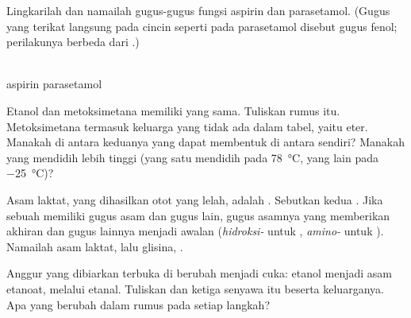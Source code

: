 \begin{exercise}[$\star\star\star$]\label{exo:g11:functional-groups:12}
Lingkarilah dan namailah gugus-gugus fungsi aspirin dan parasetamol.
(Gugus  yang terikat langsung pada cincin seperti pada
parasetamol disebut gugus fenol; perilakunya berbeda dari .)
\begin{center}
\qquad
{}
\\[2pt] \small aspirin \hspace{4.2cm} parasetamol
\end{center}
\end{exercise}

\begin{exercise}[$\star\star\star$]\label{exo:g11:functional-groups:13}
Etanol  dan metoksimetana  memiliki  yang sama. Tuliskan rumus itu. Metoksimetana termasuk keluarga
yang tidak ada dalam tabel, yaitu eter. Manakah di antara keduanya yang
dapat membentuk  di antara  sendiri?
Manakah yang mendidih lebih tinggi (yang satu mendidih pada
\qty{78}{\celsius}, yang lain pada \qty{-25}{\celsius})?
\end{exercise}

\begin{exercise}[$\star\star\star$]\label{exo:g11:functional-groups:14}
Asam laktat, yang dihasilkan otot yang lelah, adalah
. Sebutkan kedua . Jika
sebuah  memiliki gugus asam dan gugus lain, gugus asamnya yang
memberikan akhiran dan gugus lainnya menjadi awalan (\emph{hidroksi-}
untuk , \emph{amino-} untuk ). Namailah asam laktat,
lalu glisina, .
\end{exercise}

\begin{exercise}[$\star\star\star$]\label{exo:g11:functional-groups:15}
Anggur yang dibiarkan terbuka di  berubah menjadi cuka: etanol
menjadi asam etanoat, melalui etanal. Tuliskan 
dan  ketiga senyawa itu beserta keluarganya. Apa yang
berubah dalam rumus pada setiap langkah?
\end{exercise}

